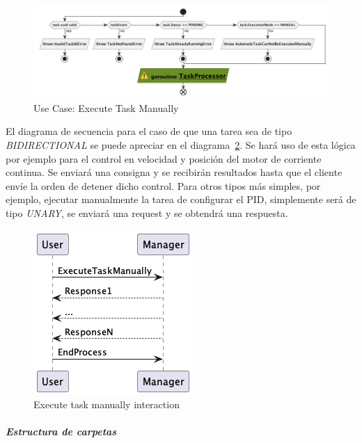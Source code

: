 \begin{itemize}
    \begin{figure}[H]
        \centering
        \includegraphics[height=0.2\textheight]{./part/Proyecto_ejecutivo/memoria_descriptiva/descripcionDelProyecto/manager/uml/1-executeTaskManual}
        \caption{Use Case: Execute Task Manually}\label{fig:Use Case-Execute Task Manually}
    \end{figure}

    El diagrama de secuencia para el caso de que una tarea sea de tipo \textit{BIDIRECTIONAL} se puede apreciar en el diagrama~\cref{fig:executeTaskManualInteraction}.
    Se hará uso de esta lógica por ejemplo para el control en velocidad y posición del motor de corriente continua.
    Se enviará una consigna y se recibirán resultados hasta que el cliente envíe la orden de detener dicho control.
    Para otros tipos más simples, por ejemplo, ejecutar manualmente la tarea de configurar el PID, simplemente será de tipo \textit{UNARY}, se enviará una request y se obtendrá una respuesta.

    \begin{figure}[H]
        \centering
        \includegraphics[height=0.2\textheight]{./part/Proyecto_ejecutivo/memoria_descriptiva/descripcionDelProyecto/manager/uml/1-ExecuteTaskManuallyInteraction}
        \caption{Execute task manually interaction}\label{fig:executeTaskManualInteraction}
    \end{figure}
\end{itemize}


\subparagraph{Estructura de carpetas}

